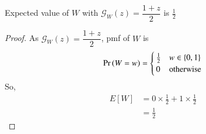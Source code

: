 \documentclass[journal,12pt,twocolumn]{IEEEtran}
\begin{document}
\begin{lemma}
Expected value of $W$ with $\mathcal{G}_W(z) = \dfrac{1+z}{2}$ is $\frac{1}{2}$
\end{lemma}
\begin{proof}
 As $\mathcal{G}_W(z) = \dfrac{1+z}{2}$, pmf of $W$ is 
 \begin{equation}
   \Pr\left(W=w\right) =
    \begin{cases}
      \frac{1}{2} & w \in \left\{0,1\right\}\\
      0 & \text{otherwise}
    \end{cases}       
\end{equation}
So,
\begin{align}
   E[W] &= 0\times\frac{1}{2} + 1\times\frac{1}{2} \\
        &= \frac{1}{2}
\end{align}
\end{proof}
\end{document}
